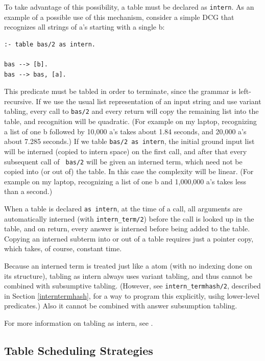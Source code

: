 To take advantage of this possibility, a table must be declared as
{\tt intern}.  As an example of a possible use of this mechanism,
consider a simple DCG that recognizes all strings of a's starting with
a single b:
\begin{verbatim}
:- table bas/2 as intern.

bas --> [b].
bas --> bas, [a].
\end{verbatim}
This predicate must be tabled in order to terminate, since the grammar
is left-recursive.  If we use the usual list representation of an
input string and use variant tabling, every call to {\tt bas/2} and
every return will copy the remaining list into the table, and
recognition will be quadratic.  (For example on my laptop, recognizing
a list of one b followed by 10,000 a's takes about 1.84 seconds, and
20,000 a's about 7.285 seconds.)  If we table {\tt bas/2 as intern},
the initial ground input list will be interned (copied to intern
space) on the first call, and after that every subsequent call of {\tt
bas/2} will be given an interned term, which need not be copied into
(or out of) the table.  In this case the complexity will be linear.
(For example on my laptop, recognizing a list of one b and 1,000,000
a's takes less than a second.)

When a table is declared {\tt as intern}, at the time of a call, all
arguments are automatically interned (with {\tt intern\_term/2})
before the call is looked up in the table, and on return, every answer
is interned before being added to the table.  Copying an interned
subterm into or out of a table requires just a pointer copy, which takes,
of course, constant time.

Because an interned term is treated just like a atom (with no indexing
done on its structure), tabling as intern always uses variant tabling,
and thus cannot be combined with subsumptive tabling.  (However, see
{\tt intern\_termhash/2}, described in Section \ref{interntermhash},
for a way to program this explicitly, usihg lower-level predicates.)
Also it cannot be combined with answer subsumption tabling.

For more information on tabling as intern, see
\cite{ciclops-2013-interning}.



\subsection{Table Scheduling Strategies} \label{section:scheduling}

